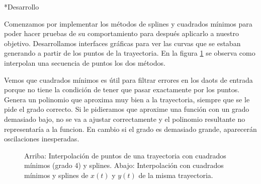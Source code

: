 \documentclass[12pt,titlepage]{article}
\newenvironment{usection}[1]{\newpage\begin{section}*{#1}	\addcontentsline{toc}{section}{#1}}{\end{section}}
\begin{document}
	\begin{usection}{Desarrollo}
		Comenzamos por implementar los métodos de splines y cuadrados mínimos para poder hacer pruebas de su comportamiento para después aplicarlo a nuestro objetivo.
		Desarrollamos interfaces gráficas para ver las curvas que se estaban generando a partir de los puntos de la trayectoria.
		En la figura \ref{fig:cmspline} se observa como interpolan una secuencia de puntos los dos métodos.
		
		Vemos que cuadrados mínimos es útil para filtrar errores en los daots de entrada porque no tiene la condición de tener que pasar exactamente por los puntos.
		Genera un polinomio que aproxima muy bien a la trayectoria, siempre que se le pide el grado correcto.
		Si le pidieramos que aproxime una función con un grado demasiado bajo, no se va a ajustar correctamente y el polinomio resultante no representaría a la funcion.
		En cambio si el grado es demasiado grande, aparecerán oscilaciones inesperadas.
		
		\begin{figure}[H]
			\centering
			\caption{
				Arriba: Interpolación de puntos de una trayectoria con cuadrados mínimos (grado 4) y splines.
				Abajo: Interpolación con cuadrados mínimos y splines de $x(t)$ y $y(t)$ de la misma trayectoria.
			}
			\label{fig:cmspline}
		\end{figure}
		

\end{usection}
\end{document}

